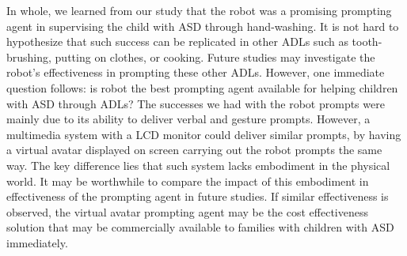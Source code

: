 In whole, we learned from our study that the robot was a promising prompting agent in supervising the child with ASD through hand-washing.  It is not hard to hypothesize that such success can be replicated in other ADLs such as tooth-brushing, putting on clothes, or cooking.  Future studies may investigate the robot's effectiveness in prompting these other ADLs.  However, one immediate question follows: is robot the best prompting agent available for helping children with ASD through ADLs?  The successes we had with the robot prompts were mainly due to its ability to deliver verbal and gesture prompts.  However, a multimedia system with a LCD monitor could deliver similar prompts, by having a virtual avatar displayed on screen carrying out the robot prompts the same way.  The key difference lies that such system lacks embodiment in the physical world.  It may be worthwhile to compare the impact of this embodiment in effectiveness of the prompting agent in future studies.  If similar effectiveness is observed, the virtual avatar prompting agent may be the cost effectiveness solution that may be commercially available to families with children with ASD immediately.



